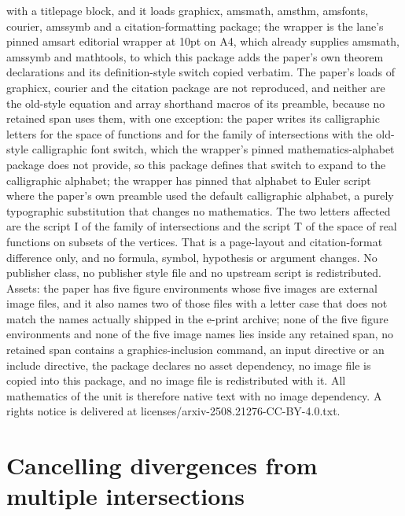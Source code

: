\documentclass[10pt,a4paper]{amsart}
\theoremstyle{definition}
\begin{document}
with a titlepage block, and it loads graphicx, amsmath, amsthm, amsfonts, courier, amssymb and a citation-formatting package; the wrapper is the lane's pinned amsart editorial wrapper at 10pt on A4, which already supplies amsmath, amssymb and mathtools, to which this package adds the paper's own theorem declarations and its definition-style switch copied verbatim. The paper's loads of graphicx, courier and the citation package are not reproduced, and neither are the old-style equation and array shorthand macros of its preamble, because no retained span uses them, with one exception: the paper writes its calligraphic letters for the space of functions and for the family of intersections with the old-style calligraphic font switch, which the wrapper's pinned mathematics-alphabet package does not provide, so this package defines that switch to expand to the calligraphic alphabet; the wrapper has pinned that alphabet to Euler script where the paper's own preamble used the default calligraphic alphabet, a purely typographic substitution that changes no mathematics. The two letters affected are the script I of the family of intersections and the script T of the space of real functions on subsets of the vertices. That is a page-layout and citation-format difference only, and no formula, symbol, hypothesis or argument changes. No publisher class, no publisher style file and no upstream script is redistributed. Assets: the paper has five figure environments whose five images are external image files, and it also names two of those files with a letter case that does not match the names actually shipped in the e-print archive; none of the five figure environments and none of the five image names lies inside any retained span, no retained span contains a graphics-inclusion command, an input directive or an include directive, the package declares no asset dependency, no image file is copied into this package, and no image file is redistributed with it. All mathematics of the unit is therefore native text with no image dependency. A rights notice is delivered at licenses/arxiv-2508.21276-CC-BY-4.0.txt.
\setcounter{section}{3}\setcounter{subsection}{0}\setcounter{theorem}{0}\renewcommand{\theequation}{\arabic{equation}}
\section{Cancelling divergences from multiple intersections}

\setcounter{equation}{12}
\end{document}
